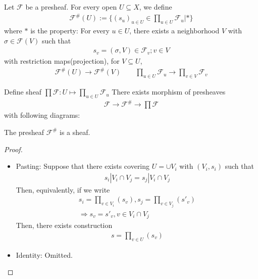 \documentclass[Total.tex]{subfiles}
\begin{document}
				\begin{Def}
					Let $\mathcal{F}$ be a presheaf. For every open $U\subseteq X$, we define
					\begin{gather*}
						\mathcal{F}^\#(U):=\{(s_u)_{u\in U}\in \prod_{u\in U} \mathcal{F}_u|*\}
					\end{gather*}
					where $*$ is the property: For every $u\in U$, there exists a neighborhood $V$ with $\sigma\in \mathcal{F}(V)$ such that
					\begin{gather*}
						s_v=(\sigma,V)\in \mathcal{F}_v;v\in V
					\end{gather*}
					with restriction maps(projection), for $V\subseteq U$,
					\begin{gather*}
						\mathcal{F}^\#(U)\rightarrow \mathcal{F}^\#(V)\qquad \prod_{u\in U} \mathcal{F}_u\rightarrow \prod_{v\in V} \mathcal{F}_v
					\end{gather*}
				\end{Def}
				Define sheaf $\prod\mathcal{F}:U\mapsto \prod_{u\in U} \mathcal{F}_u$ There exists morphism of presheaves
				\begin{gather*}
					\mathcal{F}\rightarrow \mathcal{F^\#}\rightarrow \prod\mathcal{F}
				\end{gather*}
				with following diagrams:
				\begin{center}
				\end{center}
				
				\begin{proposition}
					The presheaf $\mathcal{F}^\#$ is a sheaf.
				\end{proposition}
				\begin{proof}
					\begin{itemize}
						\item Pasting: Suppose that there exists covering $U=\cup V_i$ with $(V_i,s_i)$ such that 
						\begin{gather*}
							s_i|V_i\cap V_j=s_j|V_i\cap V_j
						\end{gather*}
						Then, equivalently, if we write
						\begin{gather*}
							s_i=\prod_{v\in V_i}(s_v),s_j=\prod_{v\in V_j} (s'_v)\\
							\Rightarrow s_v=s'_v,v\in V_i\cap V_j
						\end{gather*}
						Then, there exists construction
						\begin{gather*}
							s=\prod_{v\in U} (s_v)
						\end{gather*}
						\item Identity: Omitted.
					\end{itemize}
				\end{proof}
\end{document}

